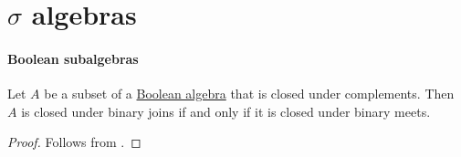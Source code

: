 \section{\texorpdfstring{\( \sigma \)}{σ} algebras}\label{sec:sigma_algebras}

\paragraph{Boolean subalgebras}

\begin{lemma}\label{thm:boolean_subalgebra_binary_de_morgan}
  Let \( A \) be a subset of a \hyperref[def:boolean_algebra]{Boolean algebra} that is closed under complements. Then \( A \) is closed under binary joins if and only if it is closed under binary meets.
\end{lemma}
\begin{proof}
  Follows from .
\end{proof}

